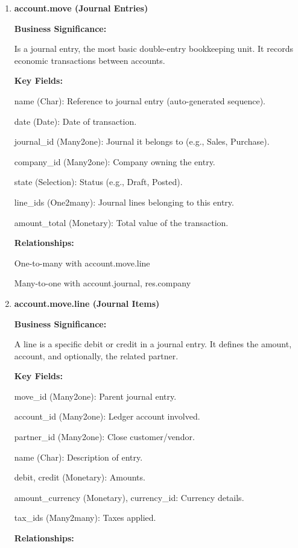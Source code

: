\documentclass[11pt,a4paper]{article}
\begin{document}
\begin{enumerate}
    \item \textbf{account.move (Journal Entries)}
    
    \textbf{Business Significance:}

    Is a journal entry, the most basic double-entry bookkeeping unit. It records economic transactions between accounts.
    \medskip

    \textbf{Key Fields:}

    name (Char): Reference to journal entry (auto-generated sequence). 

    date (Date): Date of transaction.

    journal\_id (Many2one): Journal it belongs to (e.g., Sales, Purchase). 

    company\_id (Many2one): Company owning the entry. 

    state (Selection): Status (e.g., Draft, Posted).

    line\_ids (One2many): Journal lines belonging to this entry.

    amount\_total (Monetary): Total value of the transaction.
    \medskip

    \textbf{Relationships:}

    One-to-many with account.move.line

    Many-to-one with account.journal, res.company

    \item \textbf{account.move.line (Journal Items)}
    
    \textbf{Business Significance:}

    A line is a specific debit or credit in a journal entry. It defines the amount, account, and optionally, the related partner. 
    \medskip

    \textbf{Key Fields:}

    move\_id (Many2one): Parent journal entry. 

    account\_id (Many2one): Ledger account involved. 

    partner\_id (Many2one): Close customer/vendor.

    name (Char): Description of entry. 

    debit, credit (Monetary): Amounts. 

    amount\_currency (Monetary), currency\_id: Currency details. 

    tax\_ids (Many2many): Taxes applied.
    \medskip

    \textbf{Relationships:}


\end{enumerate}
\end{document}
